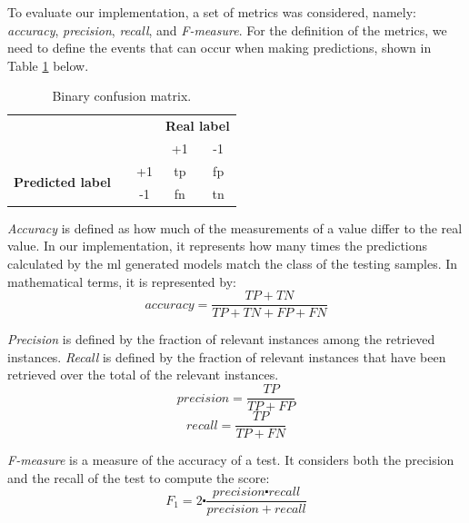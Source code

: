 To evaluate our implementation, a set of metrics was considered, namely: \emph{accuracy}, \emph{precision}, \emph{recall}, and \emph{F-measure}. For the definition of the metrics, we need to define the events that can occur when making predictions, shown in Table \ref{table:notation} below. 
\begin{table}[htp]
\centering
\caption{Binary confusion matrix.}
\label{table:notation}
\vspace*{0.2cm}
\begin{tabular}{cc|c|c|} 
\cline{3-3}\cline{4-4}
                                                         &    & \multicolumn{2}{c|}{\textbf{Real label}}                             \\ 
\cline{3-3}\cline{4-4}
                                                         &    & +1                              & -1                        \\ 
\hline
\multicolumn{1}{|c|}{\multirow{2}{*}{\textbf{Predicted label}~~}} & +1 & \ac{tp}        & \ac{fp}  \\ 
\cline{2-4}
\multicolumn{1}{|l|}{}                                   & -1 & \ac{fn}        & \ac{tn}  \\
\hline
\end{tabular}
\end{table}




\textit{Accuracy} is defined as how much of the measurements of a value differ to the real value. In our implementation, it represents how many times the predictions calculated by the \ac{ml} generated models match the class of the testing samples. In mathematical terms, it is represented by:
\begin{equation}
\label{eq:accuracy}
accuracy=\frac{TP + TN} {TP + TN + FP + FN} 
\end{equation}


\textit{Precision} is defined by the fraction of relevant instances among the retrieved instances. \textit{Recall} is defined by the fraction of relevant instances that have been retrieved over the total of the relevant instances.
\begin{equation}
\label{eq:precision}
precision=\frac{TP}{TP + FP}
\end{equation}
\begin{equation}
\label{eq:recall}
recall=\frac{TP}{TP + FN}
\end{equation}

\textit{F-measure} is a measure of the accuracy of a test. It considers both the precision and the recall of the test to compute the score:
\begin{equation}
\label{eq:f-measure}
F_1=2\centerdot \frac{precision\centerdot recall}{precision + recall}
\end{equation}



